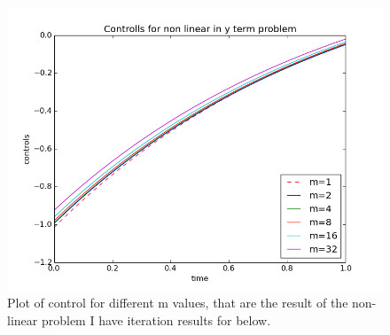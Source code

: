 \documentclass[11pt,a4paper]{article}
\begin{document}
\begin{figure}
  \includegraphics[width=\linewidth]{non_linY.png}
  \caption{Plot of control for different m values, that are the result of the non-linear problem I have iteration results for below. }
  \label{Fig 7}
\end{figure}
\newpage
\end{document}
